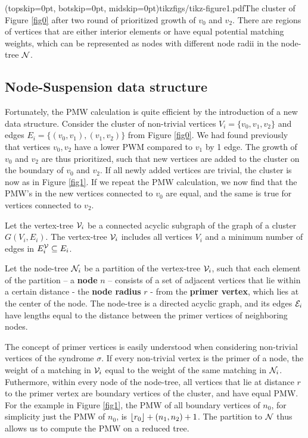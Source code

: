 \Figure[htb](topskip=0pt, botskip=0pt, midskip=0pt){tikzfigs/tikz-figure1.pdf}{The cluster of Figure \ref{fig0} after two round of prioritized growth of $v_0$ and $v_2$. There are regions of vertices that are either interior elements or have equal potential matching weights, which can be represented as nodes with different node radii in the node-tree $\mathcal{N}$. \label{fig1}}

\subsection{Node-Suspension data structure}\label{sec:nodeset}

Fortunately, the PMW calculation is quite efficient by the introduction of a new data structure. Consider the cluster of non-trivial vertices $V_i=\{v_0,v_1,v_2\}$ and edges $E_i = \{(v_0,v_1), (v_1, v_2)\}$ from Figure \ref{fig0}. We had found previously that vertices $v_0, v_2$ have a lower PWM compared to $v_1$ by 1 edge. The growth of $v_0$ and $v_2$ are thus prioritized, such that new vertices are added to the cluster on the boundary of $v_0$ and $v_2$. If all newly added vertices are trivial, the cluster is now as in Figure \ref{fig1}. If we repeat the PMW calculation, we now find that the PMW's in the new vertices connected to $v_0$ are equal, and the same is true for vertices connected to $v_2$. 
\begin{definition}\label{def:vertextree}
    Let the vertex-tree $\mathcal{V}_i$ be a connected acyclic subgraph of the graph of a cluster $G(V_i, E_i)$.   The vertex-tree $\mathcal{V}_i$ includes all vertices $V_i$ and a minimum number of edges in $E^{\mathcal{V}}_i \subseteq E_i$. 
\end{definition}
\begin{definition}
  Let the node-tree $\mathcal{N}_i$ be a partition of the vertex-tree $\mathcal{V}_i$, such that each element of the partition -- a \textbf{node} $n$ -- consists of a set of adjacent vertices that lie within a certain distance - the \textbf{node radius} $r$ - from the \textbf{primer vertex}, which lies at the center of the node. The node-tree is a directed acyclic graph, and its edges $\mathcal{E}_i$ have lengths equal to the distance between the primer vertices of neighboring nodes. 
\end{definition}

The concept of primer vertices is easily understood when considering non-trivial vertices of the syndrome $\sigma$. If every non-trivial vertex is the primer of a node, the weight of a matching in $\mathcal{V}_i$ equal to the weight of the same matching in $\mathcal{N}_i$. Futhermore, within every node of the node-tree, all vertices that lie at distance $r$ to the primer vertex are boundary vertices of the cluster, and have equal PMW. For the example in Figure \ref{fig1}, the PMW of all boundary vertices of $n_0$, for simplicity just the PMW of $n_0$, is ${\left \lfloor r_0 \right \rfloor } + (n_1, n_2) + 1$. The partition to $\mathcal{N}$ thus allows us to compute the PMW on a reduced tree. 

